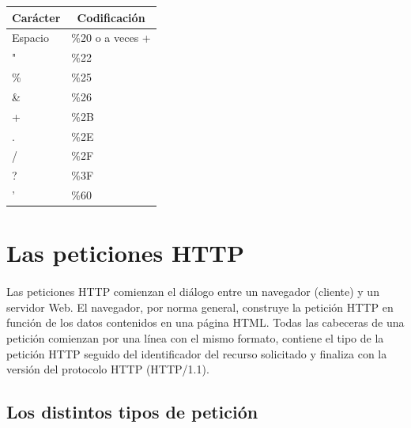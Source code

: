 \documentclass{article}
\begin{document}
	\begin{table}[H]
		\centering
		\begin{tabular}{|l|l|}
			\hline
			\multicolumn{1}{|c|}{\textbf{Carácter}} & \multicolumn{1}{c|}{\textbf{Codificación}} \\ \hline
			Espacio                                 & \%20 o a veces +                           \\ \hline
			"                                       & \%22                                       \\ \hline
			\%                                      & \%25                                       \\ \hline
			\&                                      & \%26                                       \\ \hline
			+                                       & \%2B                                       \\ \hline
			.                                       & \%2E                                       \\ \hline
			/                                       & \%2F                                       \\ \hline
			?                                       & \%3F                                       \\ \hline
			'                                       & \%60                                       \\ \hline
		\end{tabular}
	\end{table}
	
	\section{Las peticiones HTTP}
	
	\paragraph{}Las peticiones HTTP comienzan el diálogo entre un navegador (cliente) y un servidor Web. El navegador, por norma general, construye la petición HTTP en función de los datos contenidos en una página HTML. Todas las cabeceras de una petición comienzan por una línea con el mismo formato, contiene el tipo de la petición HTTP seguido del identificador del recurso solicitado y finaliza con la versión del protocolo HTTP (HTTP/1.1).
	
	\subsection{Los distintos tipos de petición}
	
\end{document}

